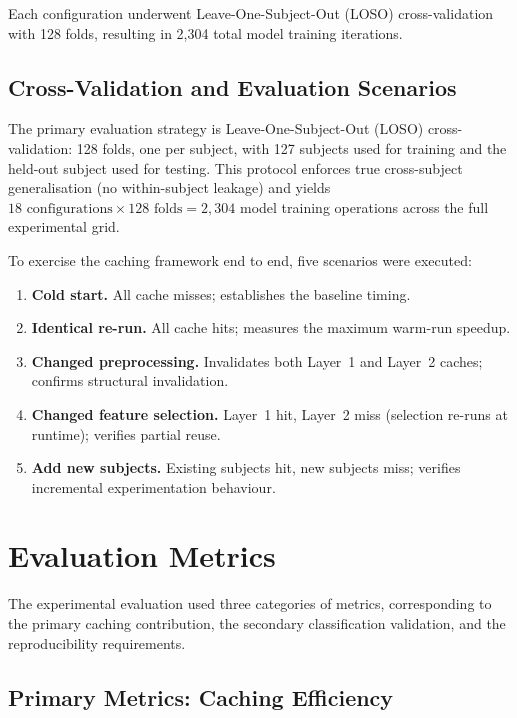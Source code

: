 Each configuration underwent Leave-One-Subject-Out (LOSO) cross-validation with 128 folds, resulting in 2{,}304 total model training iterations.

\subsection{Cross-Validation and Evaluation Scenarios}
\label{sec:cv_and_scenarios}

The primary evaluation strategy is Leave-One-Subject-Out (LOSO)
cross-validation: 128 folds, one per subject, with 127 subjects used for
training and the held-out subject used for testing. This protocol enforces
true cross-subject generalisation (no within-subject leakage) and yields
$18 \text{ configurations} \times 128 \text{ folds} = 2{,}304$ model
training operations across the full experimental grid.

To exercise the caching framework end to end, five scenarios were executed:

\begin{enumerate}
\item \textbf{Cold start.} All cache misses; establishes the baseline timing.
\item \textbf{Identical re-run.} All cache hits; measures the maximum
 warm-run speedup.
\item \textbf{Changed preprocessing.} Invalidates both Layer~1 and Layer~2
 caches; confirms structural invalidation.
\item \textbf{Changed feature selection.} Layer~1 hit, Layer~2 miss
 (selection re-runs at runtime); verifies partial reuse.
\item \textbf{Add new subjects.} Existing subjects hit, new subjects miss;
 verifies incremental experimentation behaviour.
\end{enumerate}

\section{Evaluation Metrics}
\label{sec:evaluation_plan}

The experimental evaluation used three categories of metrics, corresponding to
the primary caching contribution, the secondary classification validation, and
the reproducibility requirements.

\subsection{Primary Metrics: Caching Efficiency}

